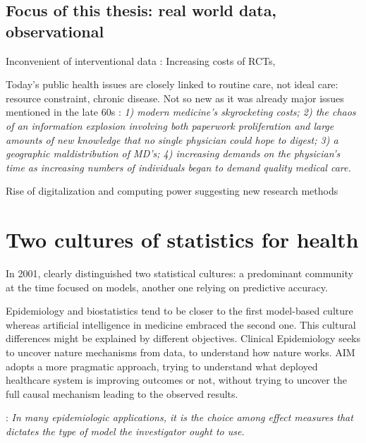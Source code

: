 \documentclass[french,12pt,twoside,a4paper]{book}
\begin{document}
\subsection{Focus of this thesis: real world data, observational}\label{subsec:intro:focus_data}

Inconvenient of interventional data : Increasing costs of RCTs,

Today's public health issues are closely linked to routine care, not ideal care:
resource constraint, chronic disease. Not so new as it was already major issues
mentioned in the late 60s \citep{rutstein1967coming}: \textit{1) modern
  medicine's skyrocketing costs; 2) the chaos of an information explosion
  involving both paperwork proliferation and large amounts of new knowledge that
  no single physician could hope to digest; 3) a geographic maldistribution of
  MD's; 4) increasing demands on the physician's time as increasing numbers of
  individuals began to demand quality medical care.}

Rise of digitalization and computing power suggesting new research methods

\section{Two cultures of statistics for health}\label{sec:intro:two_cultures}

In 2001, \cite{breiman2001statistical} clearly distinguished two statistical
cultures: a predominant community at the time focused on models, another one
relying on predictive accuracy.

Epidemiology and biostatistics tend to be closer to the first model-based culture
whereas artificial intelligence in medicine embraced the second one. This
cultural differences might be explained by different objectives. Clinical
Epidemiology seeks to uncover nature mechanisms from data, to understand how
nature works. AIM adopts a more pragmatic approach, trying to understand what
deployed healthcare system is improving outcomes or not, without trying to
uncover the full causal mechanism leading to the observed results.

\citep{rothman2012epidemiology}: \textit{In many epidemiologic applications, it is the choice among effect
  measures that dictates the type of model the investigator ought to use.}
\end{document}
